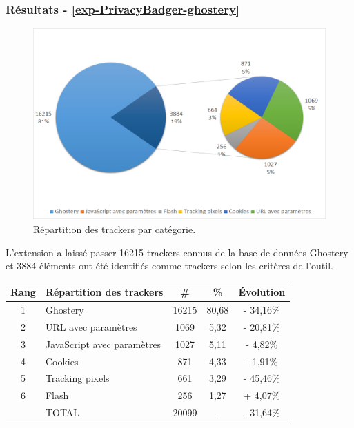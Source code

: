 \subsubsection{Résultats - \autoref{exp-PrivacyBadger-ghostery}}
\begin{figure}[!h]
	\centering
	\includegraphics[scale=.6]{resultats/ANALYSES/Images/PrivacyBadger-Ghostery.png}
	\caption{\label{exp-PrivacyBadger-ghostery}Répartition des trackers par catégorie.}
\end{figure}

L'extension a laissé passer 16215 trackers connus de la base de données Ghostery et 3884 éléments ont été identifiés comme trackers selon les critères de l'outil.\\

\begin{tabular}{ c | p{5cm} | c | c || c | }
   Rang & Répartition des trackers & \# & \% & Évolution \\
   \hline
   \hline
   1 & Ghostery & 16215 & 80,68 & - 34,16\% \\
   2 & URL avec paramètres & 1069 & 5,32 & - 20,81\% \\
   3 & JavaScript avec paramètres & 1027 & 5,11 & - 4,82\% \\
   4 & Cookies & 871 & 4,33 & - 1,91\% \\
   5 & Tracking pixels & 661 & 3,29 & - 45,46\% \\
   6 & Flash & 256 & 1,27 & + 4,07\% \\
   \hline
    & TOTAL & 20099 & - & - 31,64\%\\
   \hline
\end{tabular}
\\[1cm]

